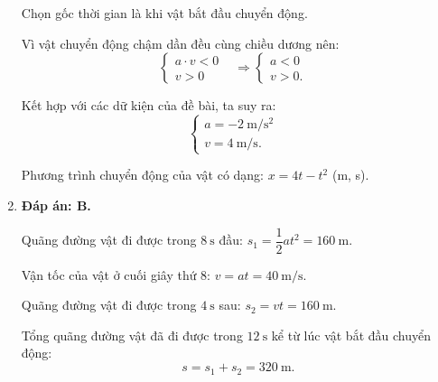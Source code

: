 \begin{enumerate}[label=\bfseries Câu \arabic*:]
{		Chọn gốc thời gian là khi vật bắt đầu chuyển động.
		
		Vì vật chuyển động chậm dần đều cùng chiều dương nên:
		\begin{equation*}
			\left\{\begin{array}{ll}{a\cdot v <0}&\\{v > 0}&\end{array}\right.\Rightarrow \left\{\begin{array}{ll}{a < 0}&\\{v > 0.}&\end{array}\right.
		\end{equation*}
		
		Kết hợp với các dữ kiện của đề bài, ta suy ra:
		\begin{equation*}
			\left\{\begin{array}{ll}{a=\SI{-2}{\meter/\second^2}}&\\{v=\SI{4}{\meter/\second} .}&\end{array}\right.
		\end{equation*}
		
		Phương trình chuyển động của vật có dạng:
		$x=4t-t^2$ (m, s).
		
		
	}
	\item {}
	
	\loigiai
	{\textbf{Đáp án: B.}
		
		Quãng đường vật đi được trong $\SI{8}{\second}$ đầu: $s_1=\dfrac{1}{2}at^2=\SI{160}{\meter}$.
		
		Vận tốc của vật ở cuối giây thứ 8: $v=at=\SI{40}{\meter / \second}$.
		
		Quãng đường vật đi được trong $\SI{4}{\second}$ sau:
		$s_2=vt=\SI{160}{\meter}$.
		
		Tổng quãng đường vật đã đi được trong $\SI{12}{\second}$ kể từ lúc vật bắt đầu chuyển động: $$s=s_1+s_2=\SI{320}{\meter}.$$
		
}
\end{enumerate}
